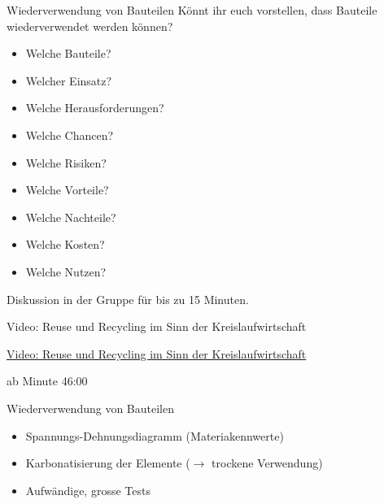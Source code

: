 \begin{frame}{Wiederverwendung von Bauteilen}
    Könnt ihr euch vorstellen, dass Bauteile wiederverwendet werden können?

    \begin{itemize}
        \item [\textbullet] Welche Bauteile?
        \item [\textbullet] Welcher Einsatz? 
        \item [\textbullet] Welche Herausforderungen?
        \item [\textbullet] Welche Chancen?
        \item [\textbullet] Welche Risiken?
        \item [\textbullet] Welche Vorteile?
        \item [\textbullet] Welche Nachteile?
        \item [\textbullet] Welche Kosten?
        \item [\textbullet] Welche Nutzen?
    \end{itemize}

    Diskussion in der Gruppe für bis zu 15 Minuten.

\end{frame}


\begin{frame}{Video: Reuse und Recycling im Sinn der \newline Kreislaufwirtschaft}

    \href{https://www.youtube.com/watch?v=-osIApQK0xI}{Video: Reuse und Recycling im Sinn der Kreislaufwirtschaft}


    ab Minute 46:00
\end{frame}



\begin{frame}{Wiederverwendung von Bauteilen}
\begin{itemize}
    \item [\textbullet] Spannungs-Dehnungsdiagramm (Materiakennwerte)
    \item [\textbullet] Karbonatisierung der Elemente ($\rightarrow$ trockene Verwendung)
    \item [\textbullet] Aufwändige, grosse Tests
\end{itemize}
\end{frame}

